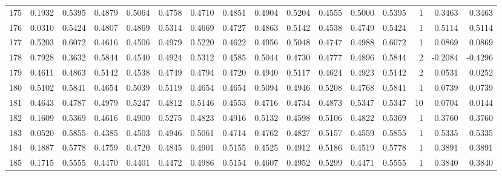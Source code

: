 \begin{tabular}{lrrrrrrrrrrrrrrr}
175 &      0.1932 &  0.5395 &  0.4879 &  0.5064 &  0.4758 &  0.4710 &  0.4851 &  0.4904 &  0.5204 &  0.4555 &   0.5000 &     0.5395 &      1 &                    0.3463 &                     0.3463 \\
176 &      0.0310 &  0.5424 &  0.4807 &  0.4869 &  0.5314 &  0.4669 &  0.4727 &  0.4863 &  0.5142 &  0.4538 &   0.4749 &     0.5424 &      1 &                    0.5114 &                     0.5114 \\
177 &      0.5203 &  0.6072 &  0.4616 &  0.4506 &  0.4979 &  0.5220 &  0.4622 &  0.4956 &  0.5048 &  0.4747 &   0.4988 &     0.6072 &      1 &                    0.0869 &                     0.0869 \\
178 &      0.7928 &  0.3632 &  0.5844 &  0.4540 &  0.4924 &  0.5312 &  0.4585 &  0.5044 &  0.4730 &  0.4777 &   0.4896 &     0.5844 &      2 &                   -0.2084 &                    -0.4296 \\
179 &      0.4611 &  0.4863 &  0.5142 &  0.4538 &  0.4749 &  0.4794 &  0.4720 &  0.4940 &  0.5117 &  0.4624 &   0.4923 &     0.5142 &      2 &                    0.0531 &                     0.0252 \\
180 &      0.5102 &  0.5841 &  0.4654 &  0.5039 &  0.5119 &  0.4654 &  0.4654 &  0.5094 &  0.4946 &  0.5208 &   0.4768 &     0.5841 &      1 &                    0.0739 &                     0.0739 \\
181 &      0.4643 &  0.4787 &  0.4979 &  0.5247 &  0.4812 &  0.5146 &  0.4553 &  0.4716 &  0.4734 &  0.4873 &   0.5347 &     0.5347 &     10 &                    0.0704 &                     0.0144 \\
182 &      0.1609 &  0.5369 &  0.4616 &  0.4900 &  0.5275 &  0.4823 &  0.4916 &  0.5132 &  0.4598 &  0.5106 &   0.4822 &     0.5369 &      1 &                    0.3760 &                     0.3760 \\
183 &      0.0520 &  0.5855 &  0.4385 &  0.4503 &  0.4946 &  0.5061 &  0.4714 &  0.4762 &  0.4827 &  0.5157 &   0.4559 &     0.5855 &      1 &                    0.5335 &                     0.5335 \\
184 &      0.1887 &  0.5778 &  0.4759 &  0.4720 &  0.4845 &  0.4901 &  0.5155 &  0.4525 &  0.4912 &  0.5186 &   0.4519 &     0.5778 &      1 &                    0.3891 &                     0.3891 \\
185 &      0.1715 &  0.5555 &  0.4470 &  0.4401 &  0.4472 &  0.4986 &  0.5154 &  0.4607 &  0.4952 &  0.5299 &   0.4471 &     0.5555 &      1 &                    0.3840 &                     0.3840 \\

\end{tabular}
